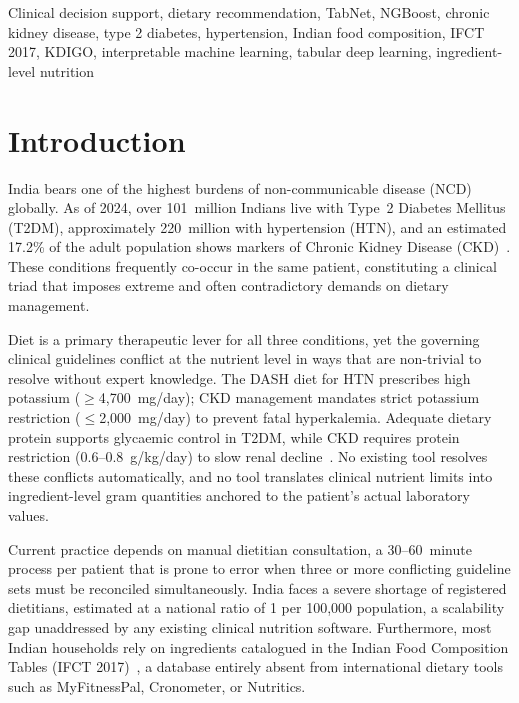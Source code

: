 \documentclass[journal]{IEEEtran}
\begin{document}
\begin{IEEEkeywords}
Clinical decision support, dietary recommendation, TabNet, NGBoost,
chronic kidney disease, type 2 diabetes, hypertension, Indian food
composition, IFCT 2017, KDIGO, interpretable machine learning,
tabular deep learning, ingredient-level nutrition
\end{IEEEkeywords}

\section{Introduction}
\label{sec:intro}

India bears one of the highest burdens of non-communicable disease
(NCD) globally. As of 2024, over 101~million Indians live with Type~2
Diabetes Mellitus (T2DM), approximately 220~million with hypertension
(HTN), and an estimated 17.2\% of the adult population shows markers of
Chronic Kidney Disease (CKD)~\cite{anjana2023}. These conditions
frequently co-occur in the same patient, constituting a clinical triad
that imposes extreme and often contradictory demands on dietary
management.

Diet is a primary therapeutic lever for all three conditions, yet the
governing clinical guidelines conflict at the nutrient level in ways
that are non-trivial to resolve without expert knowledge. The DASH diet
for HTN prescribes high potassium ($\geq$4,700~mg/day); CKD management
mandates strict potassium restriction ($\leq$2,000~mg/day) to prevent
fatal hyperkalemia. Adequate dietary protein supports glycaemic control
in T2DM, while CKD requires protein restriction (0.6--0.8~g/kg/day) to
slow renal decline~\cite{kdoqi2020,ada2024}. No existing tool resolves
these conflicts automatically, and no tool translates clinical nutrient
limits into ingredient-level gram quantities anchored to the patient's
actual laboratory values.

Current practice depends on manual dietitian consultation, a
30--60~minute process per patient that is prone to error when three or
more conflicting guideline sets must be reconciled simultaneously.
India faces a severe shortage of registered dietitians, estimated at a
national ratio of 1 per 100,000 population, a scalability gap
unaddressed by any existing clinical nutrition software. Furthermore,
most Indian households rely on ingredients catalogued in the Indian Food
Composition Tables (IFCT 2017)~\cite{ifct2017}, a database entirely
absent from international dietary tools such as MyFitnessPal, Cronometer,
or Nutritics.
\end{document}
